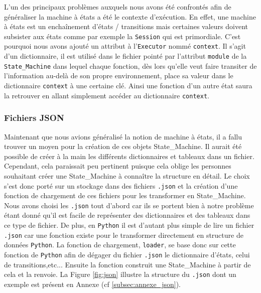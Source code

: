 \documentclass[a4paper,french]{article}
\begin{document}
L'un des principaux problèmes auxquels nous avons été confrontés afin de généraliser la machine à états a été le contexte d'exécution. En effet, une machine à états est un enchaînement d'états / transitions mais certaines valeurs doivent subsister aux états comme par exemple la \texttt{Session} qui est primordiale. C'est pourquoi nous avons ajouté un attribut à l'\texttt{Executor} nommé \texttt{context}. Il s'agit d'un dictionnaire, il est utilisé dans le fichier pointé par l'attribut \texttt{module} de la \texttt{State\_Machine} dans lequel chaque fonction, dès lors qu'elle veut faire transiter de l'information au-delà de son propre environnement, place sa valeur dans le dictionnaire \texttt{context} à une certaine clé. Ainsi une fonction d'un autre état saura la retrouver en allant simplement accéder au dictionnaire \texttt{context}.

\subsubsection{Fichiers JSON} \label{subsubsec:json}

Maintenant que nous avions généralisé la notion de machine à états, il a fallu trouver un moyen pour la création de ces objets State\_Machine. Il aurait été possible de créer à la main les différents dictionnaires et tableaux dans un fichier. Cependant, cela paraissait peu pertinent puisque cela oblige les personnes souhaitant créer une State\_Machine à connaître la structure en détail. Le choix s'est donc porté sur un stockage dans des fichiers \texttt{.json} et la création d'une fonction de chargement de ces fichiers pour les transformer en State\_Machine. Nous avons choisi les \texttt{.json} tout d'abord car ils se portent bien à notre problème étant donné qu'il est facile de représenter des dictionnaires et des tableaux dans ce type de fichier. De plus, en \texttt{Python} il est d'autant plus simple de lire un fichier \texttt{.json} car une fonction existe pour le transformer directement en structure de données \texttt{Python}. La fonction de chargement, \texttt{loader}, se base donc sur cette fonction de \texttt{Python} afin de dégager du fichier \texttt{.json} le dictionnaire d'états, celui de transitions,etc... Ensuite la fonction construit une State\_Machine à partir de cela et la renvoie. La Figure \ref{fig:json} illustre la structure du \texttt{.json} dont un exemple est présent en Annexe (cf \ref{subsec:annexe_json}).
\end{document}
